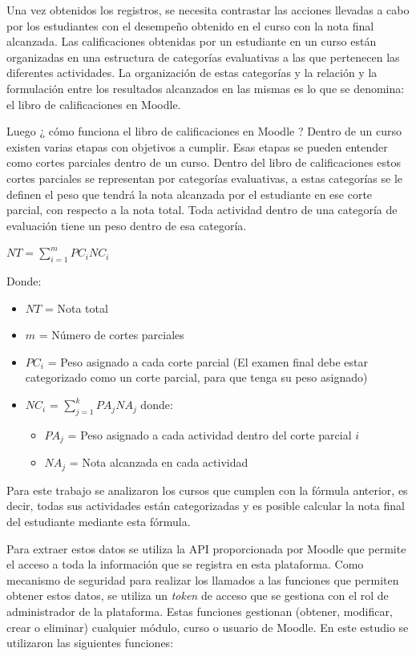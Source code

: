 Una vez obtenidos los registros, se necesita contrastar las acciones llevadas a cabo por los estudiantes con el desempeño obtenido en el curso con la nota final alcanzada. Las calificaciones obtenidas por un estudiante en un curso están organizadas en una estructura de categorías evaluativas a las que pertenecen las diferentes actividades. La organización de estas categorías y la relación y la formulación entre los resultados alcanzados en las mismas es lo que se denomina: el libro de calificaciones en Moodle.  


Luego ¿ cómo funciona el libro de calificaciones en Moodle ? Dentro de un curso existen varias etapas con objetivos a cumplir. Esas etapas se pueden entender como cortes parciales dentro de un curso. Dentro del libro de calificaciones estos cortes parciales se representan por categorías evaluativas, a estas categorías se le definen el peso que tendrá la nota alcanzada por el estudiante en ese corte parcial, con respecto a la nota total. Toda actividad dentro de una categoría de evaluación tiene un peso dentro de esa categoría.  


\begin{center}
    $NT = \displaystyle\sum_{i=1}^{m}PC_iNC_i$
\end{center}

Donde:  
\begin{itemize}
    \item $NT$ = Nota total
    \item $m$ = Número de cortes parciales
    \item $PC_i$ = Peso asignado a cada corte parcial (El examen final debe estar categorizado como un corte parcial, para que tenga su peso asignado)
    \item $NC_i$ = $\displaystyle\sum_{j=1}^{k}PA_jNA_j$ donde:
    \begin{itemize}
        \item $PA_j$ = Peso asignado a cada actividad dentro del corte parcial $i$
        \item $NA_j$ = Nota alcanzada en cada actividad
    \end{itemize}
\end{itemize}  

Para este trabajo se analizaron los cursos que cumplen con la fórmula anterior, es decir, todas sus actividades están categorizadas y es posible calcular la nota final del estudiante mediante esta fórmula.  


Para extraer estos datos se utiliza la API proporcionada por Moodle que permite el acceso a toda la información que se registra en esta plataforma. Como mecanismo de seguridad para realizar los llamados a las funciones que permiten obtener estos datos, se utiliza un \textit{token} de acceso que se gestiona con el rol de administrador de la plataforma. Estas funciones gestionan (obtener, modificar, crear o eliminar) cualquier módulo, curso o usuario de Moodle. En este estudio se utilizaron las siguientes funciones:  


